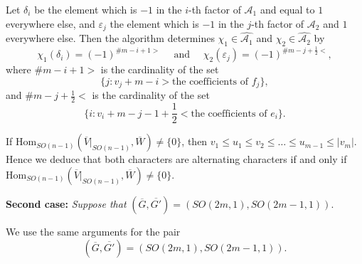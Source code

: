Let $\delta_i$ be the element which is $-1$ in the $i$-th factor
 of ${\mathcal{A}}_1$
 and equal to $1$ everywhere else, 
 and $\varepsilon_j$ the element which is $-1$
 in the $j$-th factor of ${\mathcal{A}}_2$ and $1$ everywhere else.  
Then the algorithm \cite[p.~993]{GP} determines
 $\chi_1 \in \widehat {{\mathcal{A}}_1}$
 and $\chi_2 \in \widehat {{\mathcal{A}}_2}$
 by 
\[
 \chi_1(\delta_i)= (-1)^{\#m-i+1>}
 \quad
 \mbox{ and }
 \quad 
 \chi_2(\varepsilon_j)=  (-1)^{\#m-j + \frac 1 2<}, 
\]
where $\#m-i+1>$ is the cardinality
 of the set 
\[
\{j: v_j+m-i> \text{the coefficients of $f_j$}\},
\]
 and $\# m-j+\frac 1 2 <$ is the cardinality
 of the set \[\{i:v_i +m-j-1+\frac 1 2 < \text{the coefficients of $e_i$}\}.  \]


If $\mbox{Hom}_{SO(n-1)} (\overline{V}|_{SO(n-1)},\overline{W}) \ne \{0\}$, 
 then $v_1 \leq u_1 \leq v_2 \leq \dots \leq u_{m-1} \leq |v_m|$.
Hence we deduce that both characters are  alternating characters
 if and only if 
$\mbox{Hom}_{SO(n-1)} (\overline{V}|_{SO(n-1)},  \overline{W}) \not = \{0\}$.  

\vskip 2pc
\noindent
{\bf Second case:}
\enspace 
{\it Suppose that } $(\overline{G},\overline{G'}) = (SO(2m,1), SO(2m-1,1))$.



We use the same arguments 
 for the pair 
\[
   (\overline G, \overline{G'})=(SO(2m,1), SO(2m-1,1)).
\]

